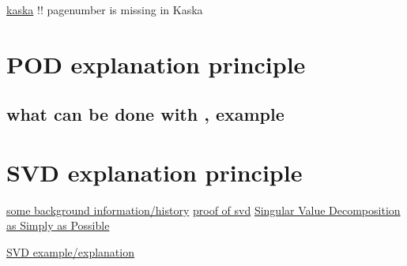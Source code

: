 \documentclass{scrartcl}
\begin{document}
\cite[]{kaska2019optimalizace}
\href{https://dspace5.zcu.cz/handle/11025/38222}{kaska}
\alert{!! pagenumber is missing in Kaska}
\cite[p62+]{gottlieb1997practical}


\section{POD explanation principle}
\cite[p595++]{bellam2021parametric}
\cite[p4+]{ribau2021flow}
\subsection{what can be done with \Comsol{} \Agros, example}


\section{SVD explanation principle}
\href{https://www.math.ucdavis.edu/~saito/courses/229A/stewart-svd.pdf}{some background information/history}
\href{https://gregorygundersen.com/blog/2018/12/20/svd-proof/}{proof of svd}
\href{https://gregorygundersen.com/blog/2018/12/10/svd/}{Singular Value Decomposition as Simply as Possible}


\href{https://www.igpm.rwth-aachen.de/Download/ss14/mor/ROM_L10_SS2014.pdf}{SVD example/explanation}

\end{document}
